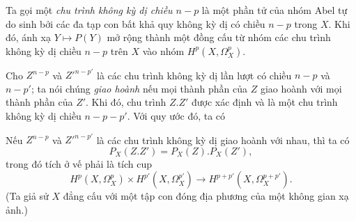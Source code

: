 Ta gọi một \emph{chu trình không kỳ dị chiều $n-p$} là một phần tử của nhóm
Abel tự do sinh bởi các đa tạp con bất khả quy không kỳ dị có
chiều $n-p$ trong $X$. Khi đó, ánh xạ $Y\longmapsto P(Y)$ mở rộng thành
một đồng cấu từ nhóm các chu trình không kỳ dị chiều $n-p$ trên $X$
vào nhóm $H^{p}(X,\Omega_X^{p})$.

Cho $Z^{n-p}$ và $Z'^{n-p'}$ là các chu trình không kỳ dị lần lượt có chiều $n-p$ và
$n-p'$; ta nói chúng \emph{giao hoành} nếu mọi thành phần
của $Z$ giao hoành với mọi thành phần của $Z'$. Khi đó, chu trình $Z.Z'$ được
xác định và là một chu trình không kỳ dị chiều $n-p-p'$. Với quy ước đó, ta có


 Nếu $Z^{n-p}$ và $Z'^{n-p'}$ là các chu trình không kỳ dị giao hoành với nhau, thì ta có
\begin{equation}\tag{4.4}
  P_X(Z.Z')=P_X(Z).P_X(Z'),
\end{equation}
trong đó tích ở vế phải là tích cup
\[
  H^{p}(X,\Omega_X^{p})\times H^{p'}(X,\Omega_X^{p'})
  \longrightarrow H^{p+p'}(X,\Omega_X^{p+p'}).
\]
(Ta giả sử $X$ đẳng cấu với một tập con đóng địa phương của một không gian
xạ ảnh.)

